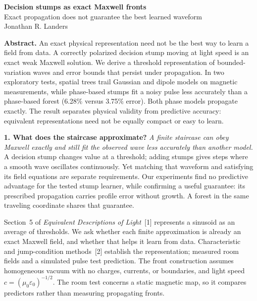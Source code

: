 \documentclass[11pt,letterpaper]{article}
\begin{document}
\begin{center}
{\Large\bfseries Decision stumps as exact Maxwell fronts}\\[4pt]
{\normalsize Exact propagation does not guarantee the best learned waveform}\\[6pt]
Jonathan R. Landers
\end{center}

\textbf{Abstract.}
An exact physical representation need not be the best way to learn a field from data.
A correctly polarized decision stump moving at light speed is an exact weak
Maxwell solution. We derive a threshold representation of bounded-variation
waves and error bounds that persist under propagation. In two exploratory tests,
spatial trees trail Gaussian and dipole models on magnetic measurements, while
phase-based stumps fit a noisy pulse less accurately than a phase-based forest
(6.28\% versus 3.75\% error). Both phase models propagate exactly. The result
separates physical validity from predictive accuracy: equivalent representations
need not be equally compact or easy to learn.

\textbf{1. What does the staircase approximate?}
\emph{A finite staircase can obey Maxwell exactly and still fit the observed wave
less accurately than another model.} A decision stump changes value at a threshold;
adding stumps gives steps where a smooth wave oscillates continuously. Yet matching
that waveform and satisfying its field equations are separate requirements.
Our experiments find no predictive advantage for the tested stump learner, while
confirming a useful guarantee: its prescribed propagation carries profile error
without growth. A forest in the same traveling coordinate shares that guarantee.

Section~5 of \emph{Equivalent Descriptions of Light}~[1] represents a sinusoid
as an average of thresholds. We ask whether each finite approximation is already
an exact Maxwell field, and whether that helps it learn from data. Characteristic
and jump-condition methods~[2] establish the representation; measured room fields
and a simulated pulse test prediction. The front construction assumes homogeneous
vacuum with no charges, currents, or boundaries, and light speed
$c=(\mu_0\varepsilon_0)^{-1/2}$. The room test concerns a static magnetic map,
so it compares predictors rather than measuring propagating fronts.
\end{document}
